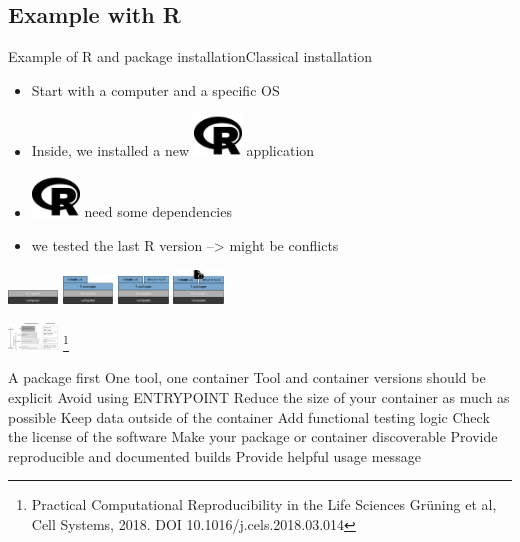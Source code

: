 \subsection{Example with R}
\begin{frame}{Example of R and package installation}{Classical installation}
\begin{itemize}
	\item Start with a computer and a specific OS
	\item Inside, we installed a new \includegraphics[width=0.1\textwidth]{images/r-project.pdf} application
	\item \includegraphics[width=0.1\textwidth]{images/r-project.pdf} need some dependencies
	\item we tested the last R version --> might be conflicts
\end{itemize}

\includegraphics[width=0.1\textwidth]{images/conda_env_1.pdf} 
\includegraphics[width=0.1\textwidth]{images/conda_env_2.pdf} 
\includegraphics[width=0.1\textwidth]{images/conda_env_3.pdf} 
\includegraphics[width=0.1\textwidth]{images/conda_env_4.pdf} 
\end{frame}

\begin{frame}
\includegraphics[width=0.1\textwidth]{images/reproductibility.jpg} \footnote{Practical Computational Reproducibility in the Life Sciences
Grüning et al, Cell Systems, 2018. DOI 10.1016/j.cels.2018.03.014}

\end{frame}
\begin{frame}

    A package first
    One tool, one container
    Tool and container versions should be explicit
    Avoid using ENTRYPOINT
    Reduce the size of your container as much as possible
    Keep data outside of the container
    Add functional testing logic
    Check the license of the software
    Make your package or container discoverable
    Provide reproducible and documented builds
    Provide helpful usage message

\end{frame}